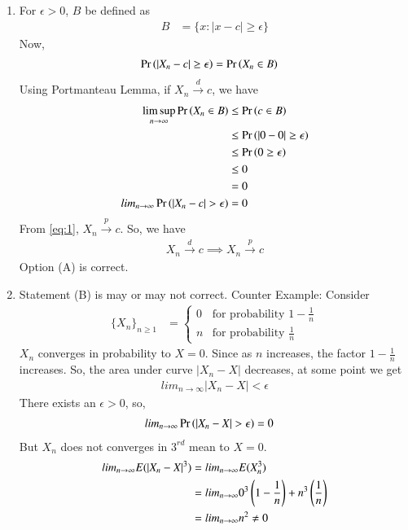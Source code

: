 \documentclass[journal,12pt,twocolumn]{IEEEtran}
\theoremstyle{remark}
\begin{document}
\begin{enumerate}[label=(\Alph*)]
\item For $\epsilon > 0$, $B$ be defined as
\begin{align}
B&=\{x: |x-c| \geq \epsilon\}
\end{align}
Now,
\begin{align}
\Pr\left(|X_n-c| \geq \epsilon\right)&= \Pr\left(X_n \in B\right)
\end{align}
Using Portmanteau Lemma, if $X_n \xrightarrow{d} c$, we have
\begin{align}
\limsup\limits_{n \to \infty}\pr{X_n \in B} & \leq \pr{c \in B}\\
& \leq \pr{|0-0|\geq \epsilon}\\
& \leq \pr{0\geq \epsilon}\\
& \leq 0\\
&=0\\
lim_{n \to \infty} \pr{|X_n-c|>\epsilon}&=0
\end{align}
From \eqref{eq:1}, $X_n \xrightarrow{p} c$. So, we have
\begin{align}
X_n \xrightarrow{d} c \implies X_n \xrightarrow{p} c
\end{align}
Option (A) is correct.
\item Statement (B) is may or may not correct.
Counter Example:
Consider 
\begin{align}
\{X_n\}_{n \geq 1}&= \begin{cases}
            0 & \text{for probability } 1-\frac{1}{n}\\
            n & \text{for probability } \frac{1}{n}
        \end{cases}
\end{align}
$X_n$ converges in probability to $X=0$. Since as $n$ increases, the factor $1-\frac{1}{n}$ increases. So, the area under curve $|X_n-X|$ decreases, at some point we get
\begin{align}
lim_{n \to \infty} |X_n-X|<\epsilon
\end{align} 
There exists an $\epsilon>0$, so, 
\begin{align}
lim_{n \to \infty} \pr{|X_n-X|>\epsilon}&=0
\end{align} 
But $X_n$ does not converges in $3^{rd}$ mean to $X=0$.
\begin{align}
lim_{n \to \infty} E(|X_n-X|^3)&=lim_{n \to \infty} E(X_n^3)\\
&=lim_{n \to \infty} 0^3\left(1-\frac{1}{n}\right)+n^3\left(\frac{1}{n}\right)\\
&=lim_{n \to \infty} n^2 \ne 0
\end{align}

\end{enumerate}
\end{document}
